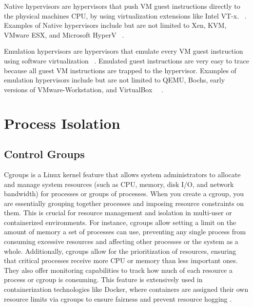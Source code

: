 \documentclass[12pt]{report}
\begin{document}
\begin{doublespace}
Native hypervisors are hypervisors that push VM guest instructions directly to the physical machines CPU, by using virtualization extensions like Intel VT-x. ~\cite{10.1145/2775111}. Examples of Native hypervisors include but are not limited to Xen, KVM, VMware ESX, and Microsoft HyperV ~\cite{patel2025hypervisor}.

Emulation hypervisors are hypervisors that emulate every VM guest instruction using software virtualization ~\cite{10.1145/2775111}. Emulated guest instructions are very easy to trace because all guest VM instructions are trapped to the hypervisor. Examples of emulation hypervisors include but are not limited to QEMU, Bochs, early versions of VMware-Workstation, and VirtualBox ~\cite{10.1145/2775111}~\cite{patel2025hypervisor}.

\section{Process Isolation}

\subsection{Control Groups}
Cgroups is a Linux kernel feature that allows system administrators to allocate and manage system resources (such as CPU, memory, disk I/O, and network bandwidth) for processes or groups of processes. When you create a cgroup, you are essentially grouping together processes and imposing resource constraints on them. This is crucial for resource management and isolation in multi-user or containerized environments. For instance, cgroups allow setting a limit on the amount of memory a set of processes can use, preventing any single process from consuming excessive resources and affecting other processes or the system as a whole. Additionally, cgroups allow for the prioritization of resources, ensuring that critical processes receive more CPU or memory than less important ones. They also offer monitoring capabilities to track how much of each resource a process or cgroup is consuming. This feature is extensively used in containerization technologies like Docker, where containers are assigned their own resource limits via cgroups to ensure fairness and prevent resource hogging \cite{brown2014cgroups}.


\end{doublespace}
\end{document}
